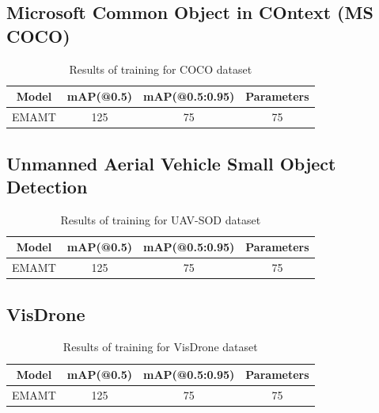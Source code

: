 \subsection{Microsoft Common Object in COntext (MS COCO)}

\begin{table}[h]
    \centering
    \begin{tabular}{|c|c|c|c|}
        \hline
        \textbf{Model}     & \textbf{mAP(@0.5)}     & \textbf{mAP(@0.5:0.95)}  & \textbf{Parameters}   \\ \hline
        EMAMT   & 125                  & 75                   & 75                                  \\ \hline
    \end{tabular}
    \caption{Results of training for COCO dataset}
    \label{tab:coco_results}
\end{table}



\subsection{Unmanned Aerial Vehicle Small Object Detection}
\begin{table}[h]
    \centering
    \begin{tabular}{|c|c|c|c|}
        \hline
        \textbf{Model}     & \textbf{mAP(@0.5)}     & \textbf{mAP(@0.5:0.95)}  & \textbf{Parameters}   \\ \hline
        EMAMT   & 125                  & 75                   & 75                              \\ \hline
    \end{tabular}
    \caption{Results of training for UAV-SOD dataset}
    \label{tab:uav_results}
\end{table}





\subsection{VisDrone}
\begin{table}[h]
    \centering
    \begin{tabular}{|c|c|c|c|}
        \hline
        \textbf{Model}     & \textbf{mAP(@0.5)}     & \textbf{mAP(@0.5:0.95)}  & \textbf{Parameters}   \\ \hline
        EMAMT   & 125                  & 75                   & 75                             \\ \hline
    \end{tabular}
    \caption{Results of training for VisDrone dataset}
    \label{tab:vis_results}
\end{table}